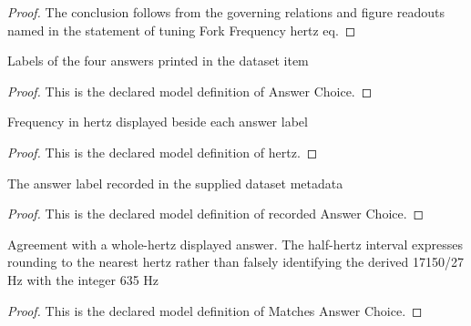 \begin{proof}
  The conclusion follows from the governing relations and figure readouts named in the statement of tuning Fork Frequency hertz eq.
\end{proof}
\begin{definition}
  \label{def:physics:phyx-mini-0223:phyxminiproblems-problemphyxmini0223-answerchoice}
  Labels of the four answers printed in the dataset item
\end{definition}
\begin{proof}
  This is the declared model definition of Answer Choice.
\end{proof}
\begin{definition}[hertz]
  \label{def:physics:phyx-mini-0223:phyxminiproblems-problemphyxmini0223-answerchoice-hertz}
  Frequency in hertz displayed beside each answer label
\end{definition}
\begin{proof}
  This is the declared model definition of hertz.
\end{proof}
\begin{definition}
  \label{def:physics:phyx-mini-0223:phyxminiproblems-problemphyxmini0223-recordedanswerchoice}
  The answer label recorded in the supplied dataset metadata
\end{definition}
\begin{proof}
  This is the declared model definition of recorded Answer Choice.
\end{proof}
\begin{definition}
  \label{def:physics:phyx-mini-0223:phyxminiproblems-problemphyxmini0223-matchesanswerchoice}
  Agreement with a whole-hertz displayed answer. The half-hertz interval expresses rounding to the nearest hertz rather than falsely identifying the derived 17150/27 Hz with the integer 635 Hz
\end{definition}
\begin{proof}
  This is the declared model definition of Matches Answer Choice.
\end{proof}
